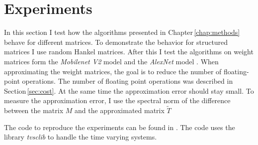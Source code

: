 \documentclass[numbers=noenddot,doctype=mastersthesis,BCOR=15mm,biblatex]{ldvbook}%
\DeclareMathOperator{\length}{len}
\begin{document}








\chapter{Experiments}\label{chap:experiments}

In this section I test how the algorithms presented in Chapter\,\ref{chap:methods} behave for different matrices.
To demonstrate the behavior for structured matrices I use random Hankel matrices.
After this I test the algorithms on weight matrices form the \emph{Mobilenet V2} model \cite{sandler_mobilenetv2_2019} and the \emph{AlexNet} model \cite{krizhevsky_one_2014}.
When approximating the weight matrices, the goal is to reduce the number of floating-point operations.
The number of floating point operations was described in Section\,\ref{sec:cost}.
At the same time the approximation error should stay small.
To measure the approximation error, I use the spectral norm of the difference between the matrix $M$ and the approximated matrix $\tilde{T}$

The code to reproduce the experiments can be found in .
The code uses the library \emph{tvsclib} \cite{kissel_time_2022} to handle the time varying systems.
\end{document}
